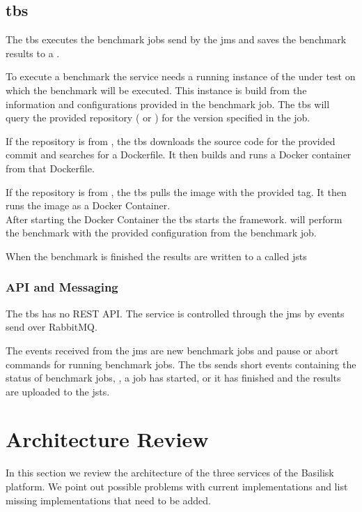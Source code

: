 \subsection{\acl{tbs}}
\label{sec:ts_benchmarking_service}
The \ac{tbs} executes the benchmark jobs send by the \ac{jms} and saves the benchmark results to a \ts{}.

To execute a benchmark the service needs a running instance of the \ts{} under test on which the benchmark will be executed.
This instance is build from the information and configurations provided in the benchmark job.
The \ac{tbs} will query the provided repository (\gh{} or \dockh{}) for the version specified in the job.

If the repository is from \gh{}, the \ac{tbs} downloads the source code for the provided commit and searches for a Dockerfile.
It then builds and runs a Docker container from that Dockerfile.

If the repository is from \dockh{}, the \ac{tbs} pulls the image with the provided tag.
It then runs the image as a Docker Container.
\\

After starting the Docker Container the \ac{tbs} starts the \iguana{} framework.
\iguana{} will perform the benchmark with the provided configuration from the benchmark job.

When the benchmark is finished the results are written to a \ts{} called \acl*{jsts}

\subsubsection{API and Messaging}
\label{sec:benchmarking_api}
The \ac{tbs} has no REST API.
The service is controlled through the \ac{jms} by events send over RabbitMQ.

The events received from the \ac{jms} are new benchmark jobs and pause or abort commands for running benchmark jobs.
The \ac{tbs} sends short events containing the status of benchmark jobs, \eg, a job has started, or it has finished and the results are uploaded to the \acl{jsts}.



\section{Architecture Review}
\label{sec:architecture_review}
In this section we review the architecture of the three services of the Basilisk platform.
We point out possible problems with current implementations and list missing implementations that need to be added.


